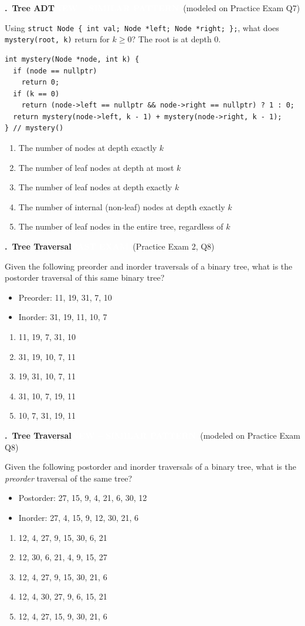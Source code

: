\documentclass[11pt]{article}
\newcounter{qnum}
\newcommand{\tagpast}[1]{\colorbox{pastc}{\textcolor{white}{\footnotesize\textbf{PAST EXAM}}}\ {\footnotesize\textcolor{pastc}{(#1)}}}
\newcommand{\tagnew}[1]{\colorbox{newc}{\textcolor{white}{\footnotesize\textbf{NEW -- SIMILAR PATTERN}}}\ {\footnotesize\textcolor{newc}{(modeled on #1)}}}
\newcommand{\question}[2]{\par\needspace{8\baselineskip}\medskip\stepcounter{qnum}%
  \noindent\textbf{\theqnum.\ #1}\hfill #2\par\nobreak\smallskip}
\newenvironment{choices}{\begin{enumerate}[label=\textbf{\Alph*)}, nosep, leftmargin=2.5em]}{\end{enumerate}}
\begin{document}
\question{Tree ADT}{\tagnew{Practice Exam Q7}}
Using \texttt{struct Node \{ int val; Node *left; Node *right; \};}, what does \texttt{mystery(root, k)} return
for $k \ge 0$? The root is at depth 0.
\begin{lstlisting}
int mystery(Node *node, int k) {
  if (node == nullptr)
    return 0;
  if (k == 0)
    return (node->left == nullptr && node->right == nullptr) ? 1 : 0;
  return mystery(node->left, k - 1) + mystery(node->right, k - 1);
} // mystery()
\end{lstlisting}
\begin{choices}
  \item The number of nodes at depth exactly $k$
  \item The number of leaf nodes at depth at most $k$
  \item The number of leaf nodes at depth exactly $k$
  \item The number of internal (non-leaf) nodes at depth exactly $k$
  \item The number of leaf nodes in the entire tree, regardless of $k$
\end{choices}

\question{Tree Traversal}{\tagpast{Practice Exam 2, Q8}}
Given the following preorder and inorder traversals of a binary tree, what is the postorder traversal of this
same binary tree?
\begin{itemize}[nosep]
  \item Preorder: 11, 19, 31, 7, 10
  \item Inorder: 31, 19, 11, 10, 7
\end{itemize}
\begin{choices}
  \item 11, 19, 7, 31, 10
  \item 31, 19, 10, 7, 11
  \item 19, 31, 10, 7, 11
  \item 31, 10, 7, 19, 11
  \item 10, 7, 31, 19, 11
\end{choices}

\question{Tree Traversal}{\tagnew{Practice Exam Q8}}
Given the following postorder and inorder traversals of a binary tree, what is the \emph{preorder} traversal of the same tree?
\begin{itemize}[nosep]
  \item Postorder: 27, 15, 9, 4, 21, 6, 30, 12
  \item Inorder: 27, 4, 15, 9, 12, 30, 21, 6
\end{itemize}
\begin{choices}
  \item 12, 4, 27, 9, 15, 30, 6, 21
  \item 12, 30, 6, 21, 4, 9, 15, 27
  \item 12, 4, 27, 9, 15, 30, 21, 6
  \item 12, 4, 30, 27, 9, 6, 15, 21
  \item 12, 4, 27, 15, 9, 30, 21, 6
\end{choices}
\end{document}
